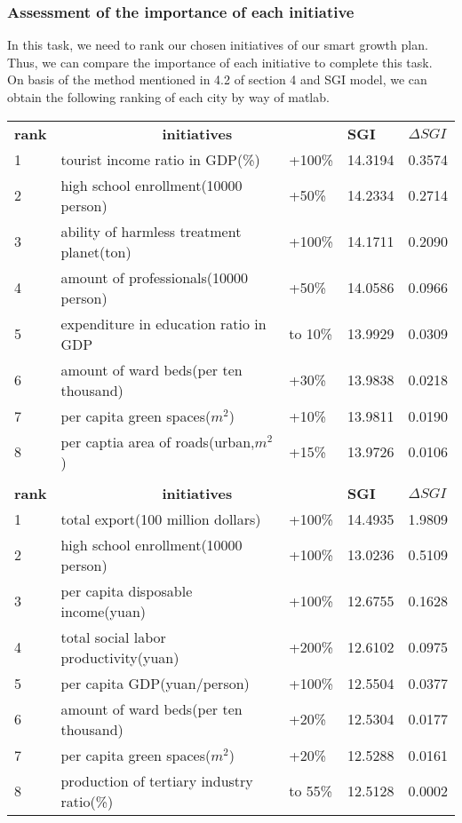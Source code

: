 \documentclass{mcmthesis}
\begin{document}
\subsubsection{Assessment of the importance of each initiative}%
In this task, we need to rank our chosen initiatives of our smart growth plan. Thus, we can compare the importance of each initiative to complete this task.\\
On basis of the method mentioned in 4.2 of section 4 and SGI model, we can obtain the   following ranking of each city by way of matlab.\\
\begin{table}[h]
\setlength{\abovecaptionskip}{0pt}
\setlength{\belowcaptionskip}{0pt}
\begin{tabular}{p{1cm}|p{7cm}|p{1.3cm}|p{1.4cm}|p{1.4cm}}
\hline
\hline
\rowcolor[gray]{0.9}\multicolumn{5}{c}{Columbia}\\
\hline
\bf rank & \multicolumn{2}{|c|}{ \bf  initiatives} & \bf SGI	&  \bf $\Delta SGI$ \\
\hline
1	& tourist income ratio in GDP(\%)	& +100\%	& 14.3194	& 0.3574 \\
2	& high school enrollment(10000 person)	& +50\%	& 14.2334	& 0.2714 \\
3	& ability of harmless treatment planet(ton)	& +100\%	& 14.1711	& 0.2090 \\
4	& amount of professionals(10000 person)	& +50\%	& 14.0586	& 0.0966 \\
5	& expenditure in education ratio in GDP	& to 10\%	& 13.9929	& 0.0309 \\
6	&  amount of ward beds(per ten thousand)	& +30\%	& 13.9838	& 0.0218 \\
7	& per capita green spaces($m^2$)	& +10\%	& 13.9811	& 0.0190 \\
8	& per captia area of roads(urban,$m^2$)	& +15\%	& 13.9726	& 0.0106 \\
\hline
\hline
\rowcolor[gray]{0.9}\multicolumn{5}{c}{Zhenjiang}\\
\hline
\bf rank & \multicolumn{2}{|c|}{ \bf  initiatives} & \bf SGI	&  \bf $\Delta SGI$ \\
\hline
1	& total export(100 million dollars)	& +100\%	& 14.4935	& 1.9809 \\
2	&  high school enrollment(10000 person)	& +100\%	& 13.0236	& 0.5109 \\
3	& per capita disposable income(yuan)	& +100\%	& 12.6755	& 0.1628 \\
4	& total social labor productivity(yuan)	& +200\%	& 12.6102	& 0.0975 \\
5	&  per capita GDP(yuan/person)	& +100\%	& 12.5504	& 0.0377 \\
6	& amount of ward beds(per ten thousand)	& +20\%	& 12.5304	& 0.0177 \\
7	&  per capita green spaces($m^2$)	& +20\%	& 12.5288	& 0.0161 \\
8	& production of tertiary industry ratio(\%)	& to 55\%	& 12.5128	& 0.0002 \\
\hline
\end{tabular}
\end{table}
\end{document}
